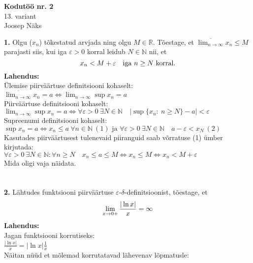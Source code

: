 \documentclass{article}
\begin{document}
\begin{center}
\Large\textbf{Kodut\"o\"o nr. 2}\\
13. variant\\
\small{Joosep N\"aks}
\end{center}
\textbf{1.} Olgu ($x_n$) t\~okestatud arvjada ning olgu $M\in\mathbb{R}$. T\~oestage, et $\displaystyle\overline{\lim_{n\to\infty}}x_n\leq M$ parajasti siis, kui iga $\varepsilon>0$ korral leidub $N\in\mathbb{N}$ nii, et\\
\begin{equation*}
x_n<M+\varepsilon\quad \text{iga }n\geq N \text{ korral.}\\
\end{equation*}
\textbf{Lahendus:}\\
\"Ulemise piirv\"a\"artuse definitsiooni kohaselt:\\
$\displaystyle\overline{\lim_{n\to\infty}}x_n=a\iff\displaystyle\lim_{n\to\infty}\sup x_n=a$\\
Piirv\"a\"artuse definitsiooni kohaselt:\\
$\displaystyle\lim_{n\to\infty}\sup x_n=a\iff\forall\varepsilon>0\ \exists N\in\mathbb{N}\quad |\sup \{x_n:\ n\geq N\}-a|<\varepsilon$\\
Supreenumi definitsiooni kohaselt:\\
$\sup x_n = a\iff x_n\leq a\ \forall n\in\mathbb{N}\ (1) \text{ ja } \forall\varepsilon>0\ \exists N\in\mathbb{N}\quad a-\varepsilon<x_N\ (2) $\\
Kasutades piirv\"a\"artusest tulenevaid piiranguid saab v\~orratuse (1) \"umber kirjutada:\\ 
$\forall\varepsilon>0\ \exists N\in\mathbb{N}: \forall n\geq N\quad x_n\leq a\leq M\iff x_n\leq M\iff x_n<M+\varepsilon$\\
Mida oligi vaja n\"aidata.\\
\\\pagebreak\\
\textbf{2.} L\"ahtudes funktsiooni piirv\"a\"artuse $\varepsilon\text{-}\delta$-definitsioonist, t\~oestage, et\\
\begin{equation*}
\lim_{x\to0+}\frac{|\ln x|}{x}=\infty\\
\end{equation*}
\textbf{Lahendus:}\\
Jagan funktsiooni korrutiseks:\\
$\frac{|\ln x|}{x}=|\ln x| \frac{1}{x}$\\
N\"aitan n\"u\"ud et m\~olemad korrutatavad l\"ahevenav l\~opmatusle:\\
\end{document}
